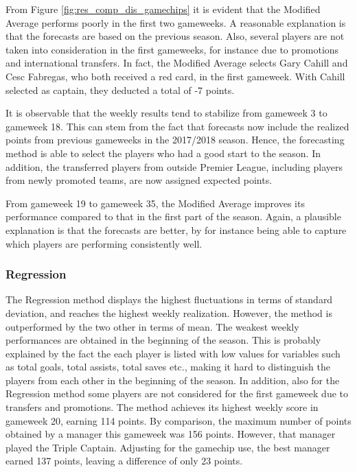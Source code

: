 From Figure \ref{fig:res_comp_dis_gamechips} it is evident that the Modified Average performs poorly in the first two gameweeks. A reasonable explanation is that the forecasts are based on the previous season. Also, several players are not taken into consideration in the first gameweeks, for instance due to promotions and international transfers. In fact, the Modified Average selects Gary Cahill and Cesc Fabregas, who both received a red card, in the first gameweek. With Cahill selected as captain, they deducted a total of -7 points.

\newpar

It is observable that the weekly results tend to stabilize from gameweek 3 to gameweek 18. This can stem from the fact that forecasts now include the realized points from previous gameweeks in the 2017/2018 season. Hence, the forecasting method is able to select the players who had a good start to the season. In addition, the transferred players from outside Premier League, including players from newly promoted teams, are now assigned expected points.

\newpar

From gameweek 19 to gameweek 35, the Modified Average improves its performance compared to that in the first part of the season. Again, a plausible explanation is that the forecasts are better, by for instance being able to capture which players are performing consistently well.


\subsubsection{Regression}


The Regression method displays the highest fluctuations in terms of standard deviation, and reaches the highest weekly realization. However, the method is outperformed by the two other in terms of mean. The weakest weekly performances are obtained in the beginning of the season. This is probably explained by the fact the each player is listed with low values for variables such as total goals, total assists, total saves etc., making it hard to distinguish the players from each other in the beginning of the season. In addition, also for the Regression method some players are not considered for the first gameweek due to transfers and promotions. The method achieves its highest weekly score in gameweek 20, earning 114 points. By comparison, the maximum number of points obtained by a manager this gameweek was 156 points. However, that manager played the Triple Captain. Adjusting for the gamechip use, the best manager earned 137 points, leaving a difference of only 23 points.

